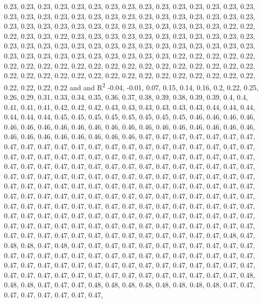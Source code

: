 \documentclass[11pt,]{article}
\begin{document}
0.23, 0.23, 0.23, 0.23, 0.23, 0.23, 0.23, 0.23, 0.23, 0.23, 0.23, 0.23,
0.23, 0.23, 0.23, 0.23, 0.23, 0.23, 0.23, 0.23, 0.23, 0.23, 0.23, 0.23,
0.23, 0.23, 0.23, 0.23, 0.23, 0.23, 0.23, 0.23, 0.23, 0.23, 0.23, 0.23,
0.23, 0.23, 0.23, 0.23, 0.23, 0.23, 0.23, 0.22, 0.22, 0.22, 0.23, 0.23,
0.22, 0.23, 0.23, 0.23, 0.23, 0.23, 0.23, 0.23, 0.23, 0.23, 0.23, 0.23,
0.23, 0.23, 0.23, 0.23, 0.23, 0.23, 0.23, 0.23, 0.23, 0.23, 0.23, 0.23,
0.23, 0.23, 0.23, 0.23, 0.23, 0.23, 0.23, 0.23, 0.23, 0.23, 0.23, 0.23,
0.23, 0.22, 0.22, 0.22, 0.22, 0.22, 0.22, 0.22, 0.22, 0.22, 0.22, 0.22,
0.22, 0.22, 0.22, 0.22, 0.22, 0.22, 0.22, 0.22, 0.22, 0.22, 0.22, 0.22,
0.22, 0.22, 0.22, 0.22, 0.22, 0.22, 0.22, 0.22, 0.22, 0.22, 0.22, 0.22,
0.22, 0.22, 0.22, 0.22 and and R\textsuperscript{2} -0.04, -0.01, 0.07,
0.15, 0.14, 0.16, 0.2, 0.22, 0.25, 0.26, 0.29, 0.31, 0.33, 0.34, 0.35,
0.36, 0.37, 0.38, 0.39, 0.38, 0.39, 0.39, 0.4, 0.4, 0.41, 0.41, 0.41,
0.42, 0.42, 0.42, 0.43, 0.43, 0.43, 0.43, 0.43, 0.43, 0.44, 0.44, 0.44,
0.44, 0.44, 0.44, 0.45, 0.45, 0.45, 0.45, 0.45, 0.45, 0.45, 0.45, 0.46,
0.46, 0.46, 0.46, 0.46, 0.46, 0.46, 0.46, 0.46, 0.46, 0.46, 0.46, 0.46,
0.46, 0.46, 0.46, 0.46, 0.46, 0.46, 0.46, 0.46, 0.46, 0.46, 0.46, 0.46,
0.46, 0.46, 0.47, 0.47, 0.47, 0.47, 0.47, 0.47, 0.47, 0.47, 0.47, 0.47,
0.47, 0.47, 0.47, 0.47, 0.47, 0.47, 0.47, 0.47, 0.47, 0.47, 0.47, 0.47,
0.47, 0.47, 0.47, 0.47, 0.47, 0.47, 0.47, 0.47, 0.47, 0.47, 0.47, 0.47,
0.47, 0.47, 0.47, 0.47, 0.47, 0.47, 0.47, 0.47, 0.47, 0.47, 0.47, 0.47,
0.47, 0.47, 0.47, 0.47, 0.47, 0.47, 0.47, 0.47, 0.47, 0.47, 0.47, 0.47,
0.47, 0.47, 0.47, 0.47, 0.47, 0.47, 0.47, 0.47, 0.47, 0.47, 0.47, 0.47,
0.47, 0.47, 0.47, 0.47, 0.47, 0.47, 0.47, 0.47, 0.47, 0.47, 0.47, 0.47,
0.47, 0.47, 0.47, 0.47, 0.47, 0.47, 0.47, 0.47, 0.47, 0.47, 0.47, 0.47,
0.47, 0.47, 0.47, 0.47, 0.47, 0.47, 0.47, 0.47, 0.47, 0.47, 0.47, 0.47,
0.47, 0.47, 0.47, 0.47, 0.47, 0.47, 0.47, 0.47, 0.47, 0.47, 0.47, 0.47,
0.47, 0.47, 0.47, 0.47, 0.47, 0.47, 0.47, 0.47, 0.47, 0.47, 0.47, 0.47,
0.47, 0.47, 0.47, 0.47, 0.47, 0.47, 0.47, 0.47, 0.47, 0.47, 0.47, 0.47,
0.47, 0.47, 0.47, 0.47, 0.47, 0.47, 0.47, 0.47, 0.47, 0.47, 0.47, 0.47,
0.47, 0.48, 0.47, 0.48, 0.48, 0.47, 0.48, 0.47, 0.47, 0.47, 0.47, 0.47,
0.47, 0.47, 0.47, 0.47, 0.47, 0.47, 0.47, 0.47, 0.47, 0.47, 0.47, 0.47,
0.47, 0.47, 0.47, 0.47, 0.47, 0.47, 0.47, 0.47, 0.47, 0.47, 0.47, 0.47,
0.47, 0.47, 0.47, 0.47, 0.47, 0.47, 0.47, 0.47, 0.47, 0.47, 0.47, 0.47,
0.47, 0.47, 0.47, 0.47, 0.47, 0.47, 0.47, 0.47, 0.47, 0.47, 0.47, 0.47,
0.47, 0.47, 0.48, 0.48, 0.48, 0.47, 0.47, 0.47, 0.48, 0.48, 0.48, 0.48,
0.48, 0.48, 0.48, 0.48, 0.47, 0.47, 0.47, 0.47, 0.47, 0.47, 0.47, 0.47,
\end{document}
